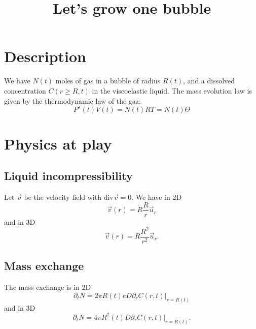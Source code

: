 \documentclass[11pt]{revtex4}
\begin{document}
\title{Let's grow one bubble}

\maketitle

\section{Description}
We have $N(t)$ moles of gas in a bubble of radius $R(t)$, and
a dissolved concentration $C(r\geq R,t)$ in the viscoelastic liquid.
The mass evolution law is given by the thermodynamic law of the gaz:
\begin{equation}
	\label{eq:evolve}
	P^\star(t) V(t) = N(t) RT = N(t) \Theta
\end{equation}

\section{Physics at play}
\subsection{Liquid incompressibility}
Let $\vec{v}$ be the velocity field with $\mathrm{div} \vec{v}=0$.
We have in 2D
\begin{equation}
	\label{eq:v2d}
	\vec{v}(r) = \dot{R} \dfrac{R}{r}\vec{u}_{r}
\end{equation}
and in 3D
\begin{equation}
	\vec{v}(r) = \dot{R} \dfrac{R^2}{r^2} \vec{u}_{r}.
\end{equation}

\subsection{Mass exchange}
The mass exchange is in 2D
\begin{equation}
	\label{eq:xch2d}
	\partial_t N = 2\pi R(t) e D \partial_r C(r,t)\vert_{r=R(t)}
\end{equation}
and in 3D
\begin{equation}
	\label{eq:xch3d}
	\partial_t N = 4\pi R^2(t) D \partial_r C(r,t)\vert_{r=R(t)}.
\end{equation}
\end{document}

